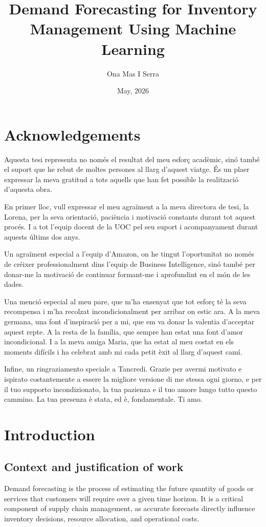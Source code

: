 \documentclass[ENG]{TFUOC}%
\title{Demand Forecasting for Inventory \newline Management Using Machine 
Learning}
\author{Ona Mas I Serra}
\date{May, 2026}
\begin{document}
\estructura

\chapter*{Acknowledgements}

Aquesta tesi representa no només el resultat del meu esforç acadèmic, sinó també el suport que he rebut de moltes persones al llarg d'aquest viatge. És un plaer expressar la meva gratitud a tots aquells que han fet possible la realització d'aquesta obra.

En primer lloc, vull expressar el meu agraïment a la meva directora de tesi, la Lorena, per la seva orientació, paciència i motivació constants durant tot aquest procés. I a tot l'equip docent de la UOC pel seu suport i acompanyament durant aquests últims dos anys.

Un agraïment especial a l'equip d'Amazon, on he tingut l'oportunitat no només de créixer professionalment dins l'equip de Business Intelligence, sinó també per donar-me la motivació de continuar formant-me i aprofundint en el món de les dades.

Una menció especial al meu pare, que m'ha ensenyat que tot esforç té la seva recompensa i m'ha recolzat incondicionalment per arribar on estic ara. A la meva germana, una font d'inspiració per a mi, que em va donar la valentia d'acceptar aquest repte. A la resta de la família, que sempre han estat una font d'amor incondicional. I a la meva amiga Maria, que ha estat al meu costat en els moments difícils i ha celebrat amb mi cada petit èxit al llarg d'aquest camí.

Infine, un ringraziamento speciale a Tancredi. Grazie per avermi motivato e ispirato costantemente a essere la migliore versione di me stessa ogni giorno, e per il tuo supporto incondizionato, la tua pazienza e il tuo amore lungo tutto questo cammino. La tua presenza è stata, ed è, fondamentale. Ti amo.

\tableofcontents
\listoffigures
\listoftables


\chapter{Introduction}


\section{Context and justification of work}

Demand forecasting is the process of estimating the future quantity of goods or services that customers will require over a given time horizon. It is a critical component of supply chain management, as accurate forecasts directly influence inventory decisions, resource allocation, and operational costs.
\end{document}
